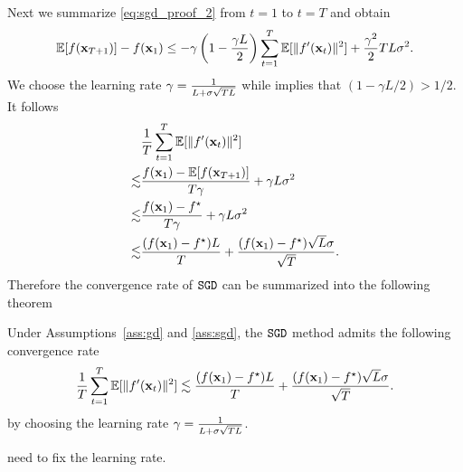 Next we summarize \eqref{eq:sgd_proof_2} from $t=1$ to $t=T$ and obtain
\begin{align}
\mathbb{E}[f({\bf x}_{T+1})] - f({\bf x}_1) \leq -\gamma\left(1-{\gamma L \over 2} \right)\sum_{t=1}^T\mathbb{E}[\|f'({\bf x}_t)\|^2] + {\gamma^2 \over 2} TL\sigma^2.
\label{eq:sgd_proof_3}
\end{align}
We choose the learning rate $\gamma = {1\over L+ \sigma\sqrt{TL}}$ while implies that $(1-\gamma L/2)> 1/2$. It follows
\begin{align*}
&{1\over T} \sum_{t=1}^T\mathbb{E}[\|f'({\bf x}_t)\|^2] 
\\ \lesssim & 
\frac{f({\bf x}_1)- \mathbb{E}[f({\bf x}_{T+1})]}{T\gamma} + \gamma L\sigma^2
\\  \lesssim &
\frac{f({\bf x}_1)- f^\star}{T\gamma} + \gamma L\sigma^2
\\ \lesssim &
{(f({\bf x}_1) - f^\star)L \over T} + {(f({\bf x}_1) - f^\star)\sqrt{L}\sigma \over \sqrt{T}}. 
\end{align*}
Therefore the convergence rate of $\texttt{SGD}$ can be summarized into the following theorem
\begin{tcolorbox}[colback=blue!5!white,colframe=black!75!black]
\begin{theorem}
Under Assumptions~\ref{ass:gd} and \ref{ass:sgd}, the $\texttt{SGD}$ method admits the following convergence rate
\begin{align}
{1\over T}\sum_{t=1}^T\mathbb{E}[\|f'({\bf x}_t)\|^2] \lesssim {(f({\bf x}_1) - f^\star)L \over T} + {(f({\bf x}_1) - f^\star)\sqrt{L}\sigma \over \sqrt{T}}. 
\end{align}
by choosing the learning rate $\gamma = {1\over L+\sigma \sqrt{TL}}$.
\end{theorem}
\end{tcolorbox}
{\rc need to fix the learning rate.}
%
%
%


 

